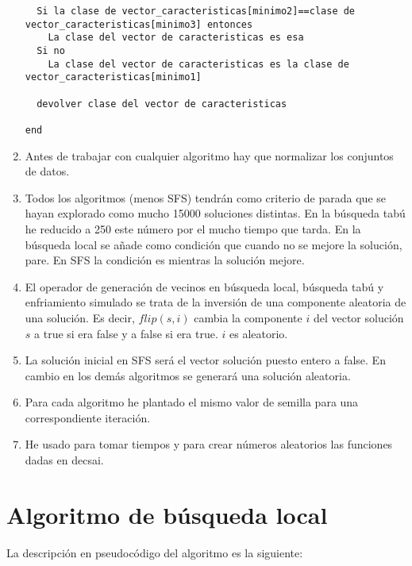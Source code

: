 \begin{enumerate}
\begin{lstlisting}
  Si la clase de vector_caracteristicas[minimo2]==clase de vector_caracteristicas[minimo3] entonces
    La clase del vector de caracteristicas es esa
  Si no
    La clase del vector de caracteristicas es la clase de vector_caracteristicas[minimo1]
    
  devolver clase del vector de caracteristicas
  
end
		\end{lstlisting}
		
		\item Antes de trabajar con cualquier algoritmo hay que normalizar los conjuntos de datos.
		
		\item Todos los algoritmos (menos SFS) tendrán como criterio de parada que se hayan explorado como mucho 15000 soluciones distintas. En la búsqueda tabú he reducido a 250 este número por el mucho tiempo que tarda. En la búsqueda local se añade como condición que cuando no se mejore la solución, pare. En SFS la condición es mientras la solución mejore.
		
		\item El operador de generación de vecinos en búsqueda local, búsqueda tabú y enfriamiento simulado se trata de la inversión de una componente aleatoria de una solución. Es decir, $flip(s,i)$ cambia la componente $i$ del vector solución $s$ a true si era false y a false si era true. $i$ es aleatorio.
		
		\item La solución inicial en SFS será el vector solución puesto entero a false. En cambio en los demás algoritmos se generará una solución aleatoria.
		
		\item Para cada algoritmo he plantado el mismo valor de semilla para una correspondiente iteración.
		
		\item He usado para tomar tiempos y para crear números aleatorios las funciones dadas en decsai.
	\end{enumerate}
	
	\newpage
	
	\section{Algoritmo de búsqueda local}
	La descripción en pseudocódigo del algoritmo es la siguiente:
	
